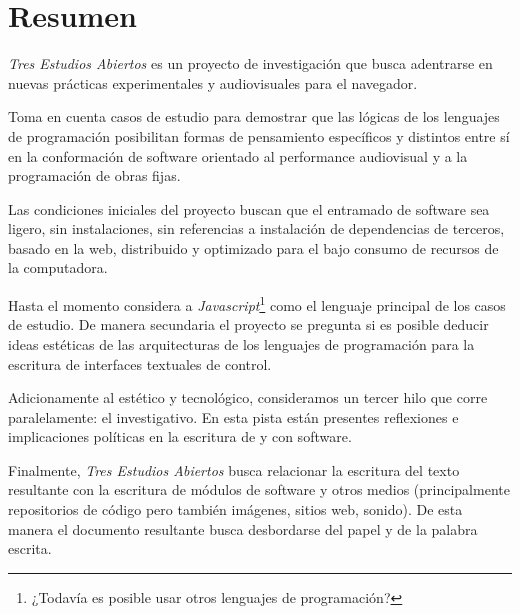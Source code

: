 
\section*{Resumen}

\textit{Tres Estudios Abiertos} es un proyecto de investigación que busca adentrarse en nuevas prácticas experimentales y audiovisuales para el navegador.

Toma en cuenta casos de estudio para demostrar que las lógicas de los lenguajes de programación posibilitan formas de pensamiento específicos y distintos entre sí en la conformación de software orientado al performance audiovisual y a la programación de obras fijas.

Las condiciones iniciales del proyecto buscan que el entramado de software sea ligero, sin instalaciones, sin referencias a instalación de dependencias de terceros, basado en la web, distribuido y optimizado para el bajo consumo de recursos de la computadora. 

Hasta el momento considera a \textit{Javascript}\footnote{¿Todavía es posible usar otros lenguajes de programación?} como el lenguaje principal de los casos de estudio. De manera secundaria el proyecto se pregunta si es posible deducir ideas estéticas de las arquitecturas de los lenguajes de programación para la escritura de interfaces textuales de control. 

Adicionamente al estético y tecnológico, consideramos un tercer hilo que corre paralelamente: el investigativo. En esta pista están presentes reflexiones e implicaciones políticas en la escritura de y con software. 

Finalmente, \textit{Tres Estudios Abiertos} busca relacionar la escritura del texto resultante con la escritura de módulos de software y otros medios (principalmente repositorios de código pero también imágenes, sitios web, sonido). De esta manera el documento resultante busca desbordarse del papel y de la palabra escrita. 
